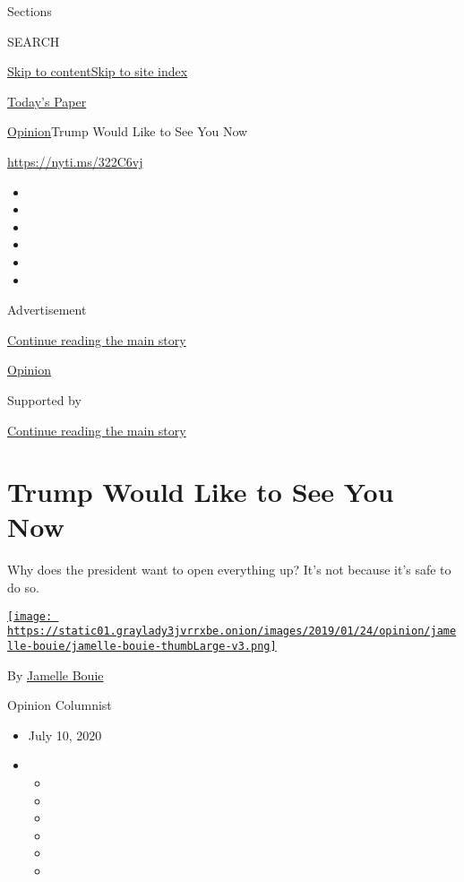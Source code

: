 Sections

SEARCH

\protect\hyperlink{site-content}{Skip to
content}\protect\hyperlink{site-index}{Skip to site index}

\href{https://myaccount.nytimes3xbfgragh.onion/auth/login?response_type=cookie\&client_id=vi}{}

\href{https://www.nytimes3xbfgragh.onion/section/todayspaper}{Today's
Paper}

\href{/section/opinion}{Opinion}\textbar{}Trump Would Like to See You
Now

\url{https://nyti.ms/322C6vj}

\begin{itemize}
\item
\item
\item
\item
\item
\item
\end{itemize}

Advertisement

\protect\hyperlink{after-top}{Continue reading the main story}

\href{/section/opinion}{Opinion}

Supported by

\protect\hyperlink{after-sponsor}{Continue reading the main story}

\hypertarget{trump-would-like-to-see-you-now}{%
\section{Trump Would Like to See You
Now}\label{trump-would-like-to-see-you-now}}

Why does the president want to open everything up? It's not because it's
safe to do so.

\href{https://www.nytimes3xbfgragh.onion/column/jamelle-bouie}{\texttt{[image: https://static01.graylady3jvrrxbe.onion/images/2019/01/24/opinion/jamelle-bouie/jamelle-bouie-thumbLarge-v3.png]}}

By
\href{https://www.nytimes3xbfgragh.onion/column/jamelle-bouie}{Jamelle
Bouie}

Opinion Columnist

\begin{itemize}
\item
  July 10, 2020
\item
  \begin{itemize}
  \item
  \item
  \item
  \item
  \item
  \item
  \end{itemize}
\end{itemize}


